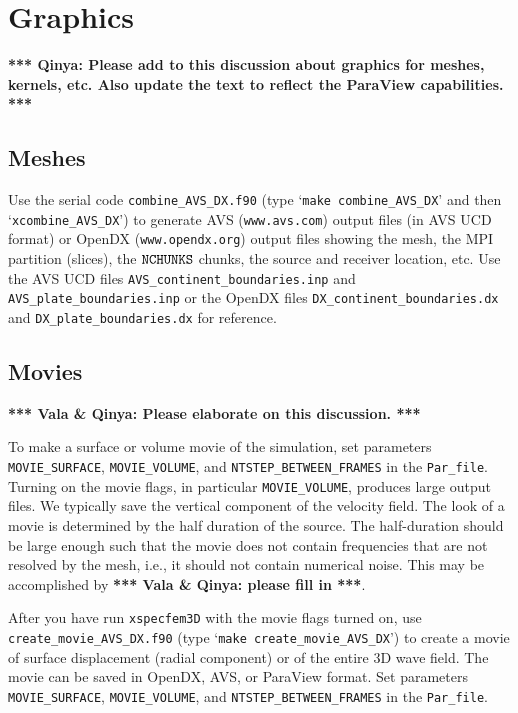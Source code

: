 \documentclass[onecolumn]{article}
\newcommand{\tovalaqinya}[1]{\textbf{*** Vala \& Qinya: #1 ***}}
\newcommand{\toqinya}[1]{\textbf{*** Qinya: #1 ***}}
\newcommand{\nchunks}{\mbox{\texttt{NCHUNKS}}}
\begin{document}
\section{Graphics}

\toqinya{Please add to this discussion about graphics for meshes, kernels, etc.
Also update the text to reflect the ParaView capabilities.}

\subsection{Meshes}
\label{section:meshgraphics}

Use the serial code \texttt{combine\_AVS\_DX.f90}
(type `\texttt{make combine\_AVS\_DX}' and then
`\texttt{xcombine\_AVS\_DX}') to generate AVS (\texttt{www.avs.com}) output files
(in AVS UCD format) or OpenDX (\texttt{www.opendx.org}) output files showing the mesh,
the MPI partition (slices), the $\nchunks$ chunks, the
source and receiver location, etc.
Use the AVS UCD files \texttt{AVS\_continent\_boundaries.inp} and
\texttt{AVS\_plate\_boundaries.inp} or the OpenDX files
\texttt{DX\_continent\_boundaries.dx} and \texttt{DX\_plate\_boundaries.dx}
for reference.

\subsection{Movies}
\label{section:movies}

\tovalaqinya{Please elaborate on this discussion.}

To make a surface or volume movie of the simulation,
set parameters
\texttt{MOVIE\_SURFACE}, \texttt{MOVIE\_VOLUME}, and \texttt{NTSTEP\_BETWEEN\_FRAMES}
in the \texttt{Par\_file}.
Turning on the movie flags, in particular  \texttt{MOVIE\_VOLUME}, produces
large output files.
We typically save the vertical component of the velocity field.
The look of a movie is determined by the half duration of the source.
The half-duration should be large enough such that the movie does
not contain frequencies that are not resolved by the mesh, i.e., it should
not contain numerical noise.
This may be accomplished by \tovalaqinya{please fill in}.

After you have run \texttt{xspecfem3D} with the movie flags turned on,
use \texttt{create\_movie\_AVS\_DX.f90} (type `\texttt{make create\_movie\_AVS\_DX}')
to create a movie of surface displacement (radial component) or of the entire 3D wave
field. The movie can be saved in OpenDX, AVS, or ParaView format.
Set parameters
\texttt{MOVIE\_SURFACE}, \texttt{MOVIE\_VOLUME}, and \texttt{NTSTEP\_BETWEEN\_FRAMES}
in the \texttt{Par\_file}.
\end{document}
